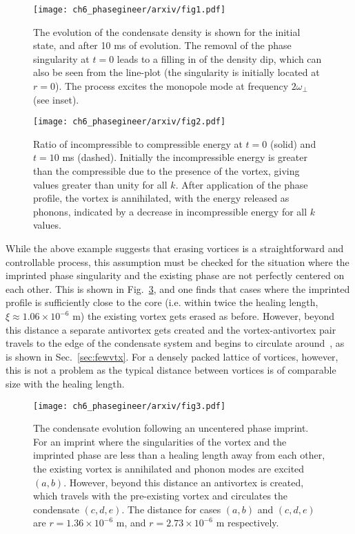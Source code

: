 \begin{figure}\centering
    \texttt{[image: ch6\_phasegineer/arxiv/fig1.pdf]}
    \caption{The evolution of the condensate density is shown for the initial state, and after 10 ms of evolution. The removal of the phase singularity at $t=0$ leads to a filling in of the density dip, which can also be seen from the line-plot (the singularity is initially located at $r=0$). The process excites the monopole mode at frequency $2\omega_\perp$ (see inset).}\label{fig:annihilation_1vtx}
\end{figure}
\begin{figure}\centering
    \texttt{[image: ch6\_phasegineer/arxiv/fig2.pdf]}
    \caption{Ratio of incompressible to compressible energy at  $t=0$ (solid) and $t=10$ ms (dashed). Initially the incompressible energy is greater than the compressible due to the presence of the vortex, giving values greater than unity for all $k$. After application of the phase profile, the vortex is annihilated, with the energy released as phonons, indicated by a decrease in incompressible energy for all $k$ values.}\label{fig:kinspec}
\end{figure}

While the above example suggests that erasing vortices is a straightforward and controllable process, this assumption must be checked for the situation where the imprinted phase singularity and the existing phase are not perfectly centered on each other. This is shown in Fig.~\ref{fig:annihilation_1vtx_uncentred}, and one finds that cases where the imprinted profile is sufficiently close to the core (i.e. within twice the healing length, $\xi\approx1.06\times 10^{-6}$ m) the existing vortex gets erased as before. However, beyond this distance a separate antivortex gets created and the vortex-antivortex pair travels to the edge of the condensate system and begins to circulate around~\cite{VTX:Martikainen_pra_2001}, as is shown in Sec.~\ref{sec:fewvtx}. For a densely packed lattice of vortices, however, this is not a problem as the typical distance between vortices is of comparable size with the healing length.

\begin{figure}\centering
    \texttt{[image: ch6\_phasegineer/arxiv/fig3.pdf]}
    \caption{The condensate evolution following an uncentered phase imprint. For an imprint where the singularities of the vortex and the imprinted phase are less than a healing length away from each other, the existing vortex is annihilated and phonon modes are excited $(a,b)$. However, beyond this distance an antivortex is created, which travels with the pre-existing vortex and circulates the condensate $(c,d,e)$. The distance for cases $(a,b)$ and $(c,d,e)$ are $r = 1.36\times10^{-6}$ m, and $r =2.73 \times10^{-6}$ m respectively.}\label{fig:annihilation_1vtx_uncentred}
\end{figure}



